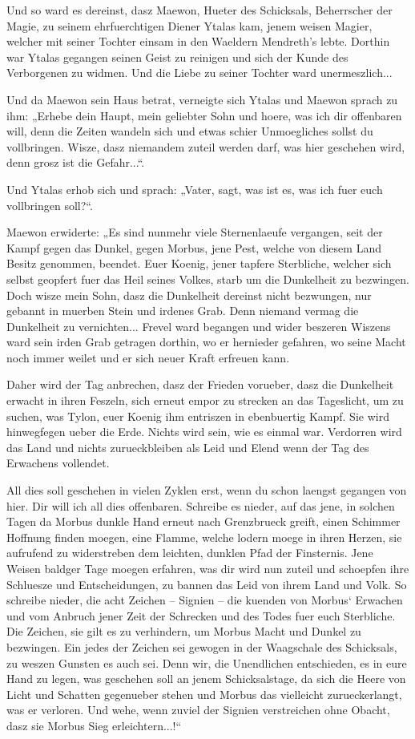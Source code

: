 \documentclass[a5paper,8pt]{book}
\begin{document}
Und so ward es dereinst, dasz Maewon, Hueter des Schicksals, Beherrscher der Magie, zu seinem ehrfuerchtigen Diener Ytalas kam, jenem weisen Magier, welcher mit seiner Tochter einsam in den Waeldern Mendreth’s lebte. Dorthin war Ytalas gegangen seinen Geist zu reinigen und sich der Kunde des Verborgenen zu widmen. Und die Liebe zu seiner Tochter ward unermeszlich... 

Und da Maewon sein Haus betrat, verneigte sich Ytalas und Maewon sprach zu ihm: „Erhebe dein Haupt, mein geliebter Sohn und hoere, was ich dir offenbaren will, denn die Zeiten wandeln sich und etwas schier Unmoegliches sollst du vollbringen. Wisze, dasz niemandem zuteil werden darf, was hier geschehen wird, denn grosz ist die Gefahr...“.

Und Ytalas erhob sich und sprach: „Vater, sagt, was ist es, was ich fuer euch vollbringen soll?“.

Maewon erwiderte: „Es sind nunmehr viele Sternenlaeufe vergangen, seit der Kampf gegen das Dunkel, gegen Morbus, jene Pest, welche von diesem Land Besitz genommen, beendet. Euer Koenig, jener tapfere Sterbliche, welcher sich selbst geopfert fuer das Heil seines Volkes, starb um die Dunkelheit zu bezwingen. Doch wisze mein Sohn, dasz die Dunkelheit dereinst nicht bezwungen, nur gebannt in muerben Stein und irdenes Grab. Denn niemand vermag die Dunkelheit zu vernichten... Frevel ward begangen und wider beszeren Wiszens ward sein irden Grab getragen dorthin, wo er hernieder gefahren, wo seine Macht noch immer weilet und er sich neuer Kraft erfreuen kann.

Daher wird der Tag anbrechen, dasz der Frieden vorueber, dasz die Dunkelheit erwacht in ihren Feszeln, sich erneut empor zu strecken an das Tageslicht, um zu suchen, was Tylon, euer Koenig ihm entriszen in ebenbuertig Kampf. Sie wird hinwegfegen ueber die Erde. Nichts wird sein, wie es einmal war. Verdorren wird das Land und nichts zurueckbleiben als Leid und Elend wenn der Tag des Erwachens vollendet.

All dies soll geschehen in vielen Zyklen erst, wenn du schon laengst gegangen von hier. Dir will ich all dies offenbaren. Schreibe es nieder, auf das jene, in solchen Tagen da Morbus dunkle Hand erneut nach Grenzbrueck greift, einen Schimmer Hoffnung finden moegen, eine Flamme, welche lodern moege in ihren Herzen, sie aufrufend zu widerstreben dem leichten, dunklen Pfad der Finsternis. Jene Weisen baldger Tage moegen erfahren, was dir wird nun zuteil und schoepfen ihre Schluesze und Entscheidungen, zu bannen das Leid von ihrem Land und Volk. So schreibe nieder, die acht Zeichen – Signien – die kuenden von Morbus‘ Erwachen und vom Anbruch jener Zeit der Schrecken und des Todes fuer euch Sterbliche. Die Zeichen, sie gilt es zu verhindern, um Morbus Macht und Dunkel zu bezwingen. Ein jedes der Zeichen sei gewogen in der Waagschale des Schicksals, zu weszen Gunsten es auch sei. Denn wir, die Unendlichen entschieden, es in eure Hand zu legen, was geschehen soll an jenem Schicksalstage, da sich die Heere von Licht 
und Schatten gegenueber stehen und Morbus das vielleicht zurueckerlangt, was er verloren. Und wehe, wenn zuviel der Signien verstreichen ohne Obacht, dasz sie Morbus Sieg erleichtern...!“
\end{document}
